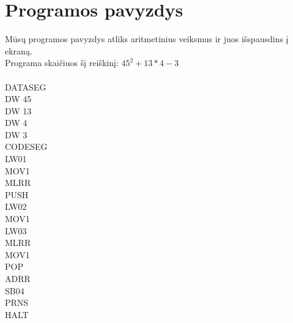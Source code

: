 \section{Programos pavyzdys}
	Mūsų programos pavyzdys atliks aritmetinius veiksmus ir juos išspausdins į ekraną.\\
	Programa skaičiuos šį reiškinį: \(45^2 + 13*4 - 3\)\\\\
	DATASEG\\
	DW 45\\
	DW 13\\
	DW 4\\
	DW 3\\
	CODESEG\\
	LW01\\
	MOV1\\
	MLRR\\
	PUSH\\
	LW02\\
	MOV1\\
	LW03\\
	MLRR\\
	MOV1\\
	POP\\
	ADRR\\
	SB04\\
	PRNS\\
	HALT\\
\clearpage